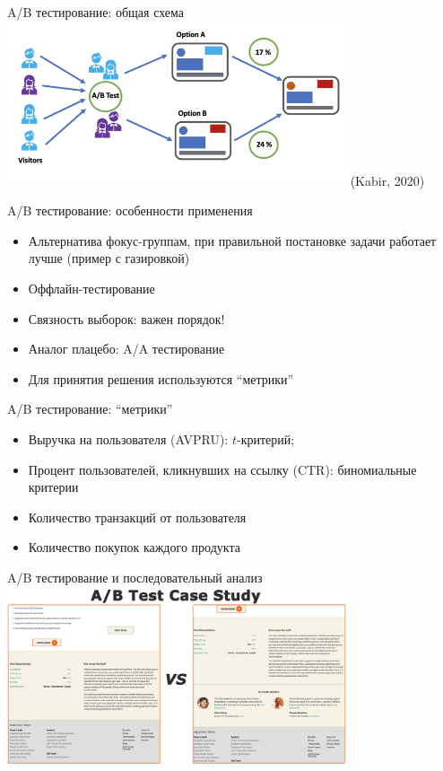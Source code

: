 \documentclass[9pt,pdf,utf8,hyperref={unicode},aspectratio=169]{beamer}
\begin{document}
\begin{frame}{A/B тестирование: общая схема}
\centering
\includegraphics[width=0.75\textwidth]{ab.png}
(Kabir, 2020)
\end{frame}

\begin{frame}{A/B тестирование: особенности применения}
\begin{itemize}
\item Альтернатива фокус-группам, при правильной постановке задачи работает лучше (пример с газировкой)
\item Оффлайн-тестирование
\item Связность выборок: важен порядок!
\item Аналог плацебо: A/A тестирование
\item Для принятия решения используются ``метрики''
\end{itemize}
\end{frame}


\begin{frame}{A/B тестирование: ``метрики''}
\begin{itemize}
\item Выручка на пользователя (AVPRU): $t$-критерий;
\item Процент пользователей, кликнувших на ссылку (CTR): биномиальные критерии
\item Количество транзакций от пользователя
\item Количество покупок каждого продукта
\end{itemize}
\end{frame}

\begin{frame}{A/B тестирование и последовательный анализ}
\centering
\includegraphics[width=0.75\textwidth]{ab2.png}
\end{frame}
\end{document}
